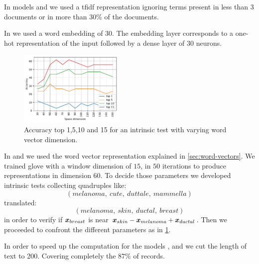 In models \svm{} and \svmb{} we used a \ac{tfidf}
representation ignoring terms present in less
than 3 documents or in
more than 30\% of the documents. 

In \lstmng{} we used a word embedding of $30$. The
embedding layer corresponds to a one-hot representation of the input
followed by a dense layer of $30$ neurons.

\begin{figure}
  \centering
  \includegraphics[width=0.45\textwidth]{img/gloveParameter.pdf}
  \caption{Accuracy top 1,5,10 and 15 for an intrinsic test with
    varying word vector dimension.}
  \label{fig:gloveParameter}
\end{figure}
In \lstmb{} and \lstmc{} we used the word vector representation
explained in \cref{sec:word-vectors}. We trained \ac{glove} with a window dimension of $15$,
in $50$ iterations to produce representations in dimension $60$. To
decide those parameters we developed intrinsic tests collecting
quadruples like:
$$
(melanoma,\ cute,\ duttale,\ mammella)
$$
translated:
$$
(melanoma,\ skin,\ ductal,\ breast)
$$
in order to verify if $\bm{x}_{breast}$ is near
$\bm{x}_{skin}-\bm{x}_{melanoma}+\bm{x}_{ductal}$. Then we
proceeded to confront the different parameters as in
\cref{fig:gloveParameter}.

In order to speed up the computation for the models \lstmng{}, \lstmb{}
and \lstmc{} we cut the length of text to 200. Covering completely the
$87\%$ of records.

